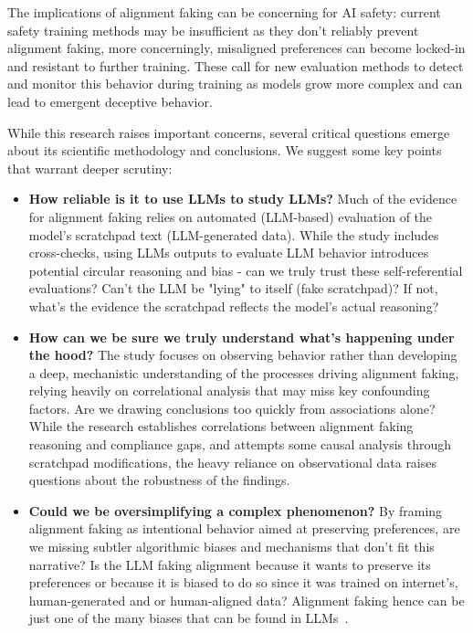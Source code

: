 The implications of alignment faking can be concerning for AI safety: current safety training methods may be insufficient as they don't reliably prevent alignment faking, more concerningly, misaligned preferences can become locked-in and resistant to further training. These call for new evaluation methods to detect and monitor this behavior during training as models grow more complex and can lead to emergent deceptive behavior.

While this research raises important concerns, several critical questions emerge about its scientific methodology and conclusions. We suggest some key points that warrant deeper scrutiny:

\begin{itemize}
\item \textbf{How reliable is it to use LLMs to study LLMs?} Much of the evidence for alignment faking relies on automated (LLM-based) evaluation of the model's scratchpad text (LLM-generated data). While the study includes cross-checks, using LLMs outputs to evaluate LLM behavior introduces potential circular reasoning and bias - can we truly trust these self-referential evaluations? Can't the LLM be "lying" to itself (fake scratchpad)? If not, what's the evidence the scratchpad reflects the model's actual reasoning?

\item \textbf{How can we be sure we truly understand what's happening under the hood?} The study focuses on observing behavior rather than developing a deep, mechanistic understanding of the processes driving alignment faking, relying heavily on correlational analysis that may miss key confounding factors. Are we drawing conclusions too quickly from associations alone? While the research establishes correlations between alignment faking reasoning and compliance gaps, and attempts some causal analysis through scratchpad modifications, the heavy reliance on observational data raises questions about the robustness of the findings.

\item \textbf{Could we be oversimplifying a complex phenomenon?} By framing alignment faking as intentional behavior aimed at preserving preferences, are we missing subtler algorithmic biases and mechanisms that don't fit this narrative? Is the LLM faking alignment because it wants to preserve its preferences or because it is biased to do so since it was trained on internet's, human-generated and or human-aligned data? Alignment faking hence can be just one of the many biases that can be found in LLMs~.


\end{itemize}
